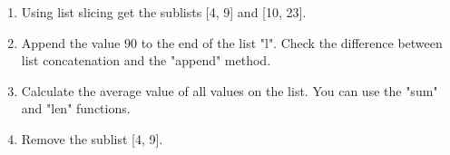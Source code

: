 \begin{enumerate}

\item Using list slicing get the sublists [4, 9] and [10, 23].

\item Append the value 90 to the end of the list "l". Check the difference between list concatenation and the "append" method.

\item Calculate the average value of all values on the list. You can use the "sum" and "len" functions.

\item Remove the sublist [4, 9].

\end{enumerate}
